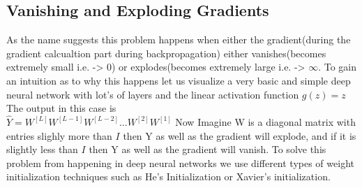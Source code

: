 \documentclass[12pt]{article}
\begin{document}
\subsection{Vanishing and Exploding Gradients}
As the name suggests this problem happens when either the gradient(during the gradient calcualtion part during backpropagation) either vanishes(becomes extremely small i.e. -> 0) or explodes(becomes extremely large i.e. -> $\infty$. To gain an intuition as to why this happens let us visualize a very basic and simple deep neural network with lot's of layers and the linear activation function $g(z)=z$ \\ 
The output in this case is \\ 
$\hat{Y} = W^{[L]}W^{[L-1]}W^{[L-2]}\dots W^{[2]}W^{[1]}$
Now Imagine W is a diagonal matrix with entries slighly more than $I$ then Y as well as the gradient will explode, and if it is slightly less than $I$ then Y as well as the gradient will vanish. To solve this problem from happening in deep neural networks we use different types of weight initialization techniques such as He's Initialization or Xavier's initialization.
\end{document}

